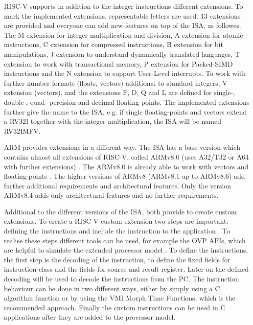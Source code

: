 \documentclass[conference]{IEEEtran}
\begin{document}
	RISC-V supports in addition to the integer instructions different extensions. To mark the implemented extensions, representable letters are used. 13 extensions are provided and everyone can add new features on top of the \gls{ISA}, as followes. The M extension for integer multiplication and division, A extension for atomic instructions, C extension for compressed instructions, B extension for bit manipulations, J extension to understand dynamically translated languages, T extension to work with transactional memory, P extension for Packed-\gls{SIMD} instructions and the N extension to support User-Level interrupts. To work with further number formats (floats, vectors) additional to standard integers, V extension (vectors), and the extensions F, D, Q and L are defined for single-, double-, quad- percision and decimal floating points. The implemented extensions further give the name to the \gls{ISA}, e.g. if single floating-points and vectors extend a RV32I together with the integer multiplication, the \gls{ISA} will be named RV32IMFV. \cite[page 31-52, 71-103]{Waterman2017}
	
	ARM provides extensions in a different way. The \gls{ISA} has a base version which contains almost all extensions of RISC-V, called ARMv8.0 (uses A32/T32 or A64 with further extensions) \cite[page 60]{Arm2020}. The ARMv8.0 is already able to work with vectors and floating-points \cite[page 40- 50]{Arm2020}. The higher versions of ARMv8 (ARMv8.1 up to ARMv8.6) add further additional requirements and architectural features. Only the version ARMv8.4 adds only architectural features and no further requirements. \cite[page 60ff]{Arm2020}
	
	Additional to the different versions of the \gls{ISA}, both provide to create custom extensions.
	To create a RISC-V custom extension two steps are important: defining the instructions and include the instruction to the application \cite[page 16 - 21]{Limited2019}. To realise these steps different tools can be used, for example the OVP APIs, which are helpful to simulate the extended processor model \cite{Imperas}.
	To define the instructions, the first step is the decoding of the instruction, to define the fixed fields for instruction class and the fields for source and result register. Later on the defined decoding will be used to decode the instructions from the PC. The instruction behaviour can be done in two different ways, either by simply using a C algorithm function or by using the VMI Morph Time Functions, which is the recommended approach. Finally the custom instructions can be used in C applications after they are added to the processor model. \cite[page 16 - 21]{Limited2019}
	
\end{document}
